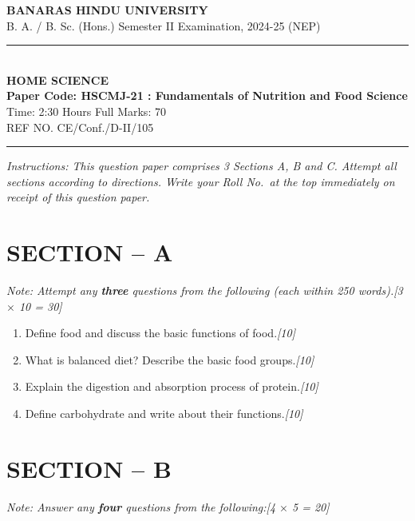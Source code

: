\documentclass[11pt,a4paper]{article}
\newcommand{\pts}[1]{\hfill \textit{[#1]}}
\begin{document}
\begin{center}
  {\large\bfseries BANARAS HINDU UNIVERSITY}\\[2pt]
  {\normalsize B. A. / B. Sc. (Hons.) Semester II Examination, 2024-25 (NEP)}\\[6pt]
  \rule{0.8\linewidth}{0.5pt}\\[6pt]
  {\large\bfseries HOME SCIENCE}\\[4pt]
  {\large\bfseries Paper Code: HSCMJ-21 : Fundamentals of Nutrition and Food Science}\\[4pt]
  {\normalsize Time: 2:30 Hours \hfill Full Marks: 70}\\[2pt]
  {\small REF NO. CE/Conf./D-II/105}
\end{center}
\rule{\linewidth}{0.4pt}
\smallskip

\noindent \textit{Instructions: This question paper comprises 3 Sections A, B and C. Attempt all sections according to directions. Write your Roll No.\ at the top immediately on receipt of this question paper.}

\bigskip

\section*{SECTION -- A}
\noindent \textit{Note: Attempt any \textbf{three} questions from the following (each within 250 words).}\pts{3 $\times$ 10 = 30}

\begin{enumerate}[label=\textbf{\arabic*.},leftmargin=*,itemsep=10pt]

  \item Define food and discuss the basic functions of food.\pts{10}

  \item What is balanced diet? Describe the basic food groups.\pts{10}

  \item Explain the digestion and absorption process of protein.\pts{10}

  \item Define carbohydrate and write about their functions.\pts{10}

\end{enumerate}

\bigskip

\section*{SECTION -- B}
\noindent \textit{Note: Answer any \textbf{four} questions from the following:}\pts{4 $\times$ 5 = 20}
\end{document}
